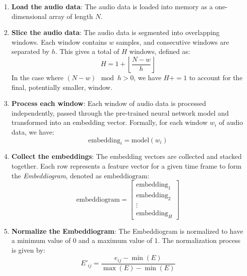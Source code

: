 \begin{enumerate}
\item \textbf{Load the audio data}: The audio data is loaded into memory as a one-dimensional array of length $N$.

\item \textbf{Slice the audio data}: The audio data is segmented into overlapping windows. Each window contains $w$ samples, and consecutive windows are separated by $h$. This gives a total of $H$ windows, defined as:
\begin{equation}
H = 1 + \left\lfloor \frac{N - w}{h} \right\rfloor
\end{equation}
In the case where $\left( N - w \right) \mod h > 0$, we have $H += 1$ to account for the final, potentially smaller, window.

\item \textbf{Process each window}: Each window of audio data is processed independently, passed through the pre-trained neural network model and transformed into an embedding vector. Formally, for each window $w_i$ of audio data, we have:
\begin{equation}
\text{embedding}_i = \text{model}(w_i)
\end{equation}

\item \textbf{Collect the embeddings}: The embedding vectors are collected and stacked together. Each row represents a feature vector for a given time frame to form the \textit{Embeddiogram}, denoted as $\text{embeddiogram}$:
\begin{equation}
\text{embeddiogram} = \begin{bmatrix} \text{embedding}_1 \\ \text{embedding}_2 \\ \vdots \\ \text{embedding}_H \end{bmatrix}
\end{equation}

\item \textbf{Normalize the Embeddiogram}: The Embeddiogram is normalized to have a minimum value of 0 and a maximum value of 1. The normalization process is given by:
\begin{equation}
E'_{ij} = \frac{e_{ij} - \min(E)}{\max(E) - \min(E)}
\end{equation}
\end{enumerate}



